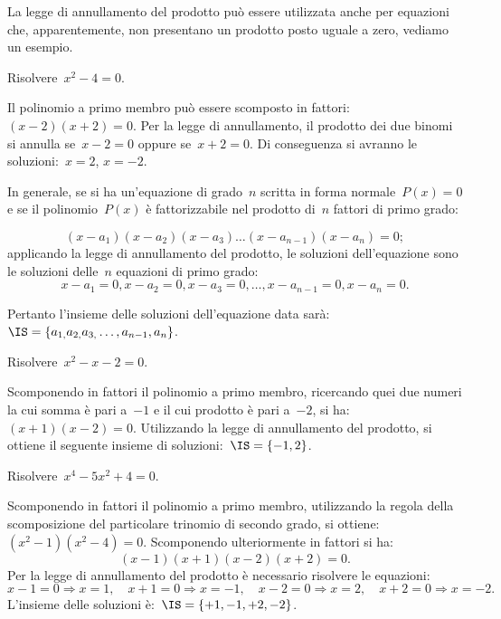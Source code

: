La legge di annullamento del prodotto può essere utilizzata anche per 
equazioni che, apparentemente, non presentano un prodotto posto uguale a zero, 
vediamo un esempio.

 \begin{esempio}
Risolvere~$x^{2}-4=0$.

Il polinomio a primo membro può essere scomposto in fattori:~$(x-2)(x+2)=0$.
Per la legge di annullamento, il prodotto dei due binomi si annulla se~$x-2=0$ 
oppure se~$x+2=0$.
Di conseguenza si avranno le soluzioni:~$x=2$, $x=-2$.
 \end{esempio}

In generale, se si ha un'equazione di grado~$n$ scritta in forma 
normale~$P(x)=0$ e se il polinomio~$P(x)$ è fattorizzabile nel prodotto 
di~$n$ fattori di primo grado:

\begin{equation*}
(x-a_{1})(x-a_{2})(x-a_{3})\ldots (x-a_{n-1})(x-a_{n})=0;
\end{equation*}
applicando la legge di annullamento del prodotto, le soluzioni dell'equazione 
sono le soluzioni delle~$n$ equazioni di primo grado:
\begin{equation*}
x-a_{1}=0,x-a_{2}=0,x-a_{3}=0,\ldots, x-a_{n-1}=0,x-a_{n}=0.
\end{equation*}

Pertanto l'insieme delle soluzioni dell'equazione data 
sarà:~$\IS=\{a_{1,}a_{2,}a_{3,}\ldots,a_{n-1},a_{n}\}$.

 \begin{esempio}
Risolvere~$x^{2}-x-2=0$.

Scomponendo in fattori il polinomio a primo membro, ricercando quei due numeri 
la cui somma è pari a~$-1$ e il cui prodotto è pari a~$-2$, 
si ha:~$(x+1)(x-2)=0$.
Utilizzando la legge di annullamento del prodotto, si ottiene il seguente 
insieme di soluzioni:~$\IS=\{-1,2\}$.
 \end{esempio}

 \begin{esempio}
Risolvere~$x^{4}-5x^{2}+4=0$.

Scomponendo in fattori il polinomio a primo membro, utilizzando la regola 
della scomposizione del particolare trinomio di secondo grado, si 
ottiene:~$(x^{2}-1)(x^{2}-4)=0$. Scomponendo ulteriormente in fattori si ha:
\begin{equation*}
(x-1)(x+1)(x-2)(x+2)=0.
\end{equation*}
Per la legge di annullamento del prodotto è necessario risolvere le equazioni:
\begin{equation*}
x-1=0 \Rightarrow x=1, \quad x+1=0 \Rightarrow x=-1,\quad 
x-2=0 \Rightarrow x=2, \quad x+2=0 \Rightarrow x=-2.
\end{equation*}
L'insieme delle soluzioni è:~$\IS=\{+1,-1,+2,-2\}$.
 \end{esempio}

